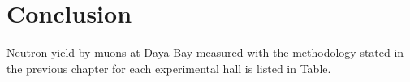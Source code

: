 \chapter{Conclusion}

Neutron yield by muons at Daya Bay measured with the methodology stated in the previous chapter for each experimental hall is listed in Table.


